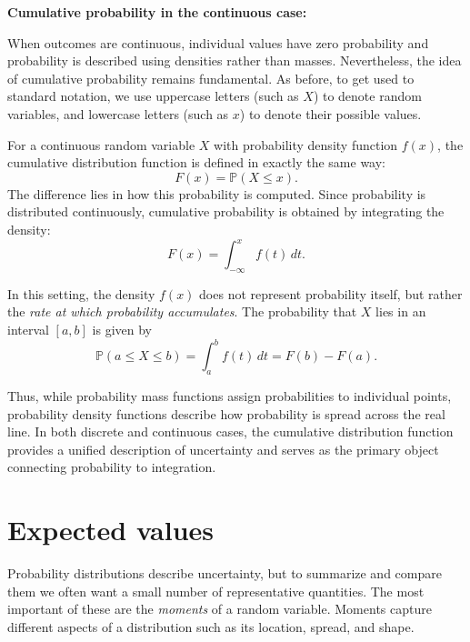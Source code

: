 \medskip

\textbf{Cumulative probability in the continuous case:}

\medskip

When outcomes are continuous, individual values have zero probability and probability is described using densities rather than masses. Nevertheless, the idea of cumulative probability remains fundamental. As before, to get used to standard notation, we use uppercase letters (such as $X$) to denote random variables, and lowercase letters (such as $x$) to denote their possible values.

\medskip

For a continuous random variable $X$ with probability density function $f(x)$, the cumulative distribution function is defined in exactly the same way:
\begin{equation}
    F(x) = \mathbb{P}(X \le x).
\end{equation}
The difference lies in how this probability is computed. Since probability is distributed continuously, cumulative probability is obtained by integrating the density:
\begin{equation}
    F(x) = \int_{-\infty}^{x} f(t)\,dt.
\end{equation}

\medskip

In this setting, the density $f(x)$ does not represent probability itself, but rather the \emph{rate at which probability accumulates}. The probability that $X$ lies in an interval $[a,b]$ is given by
\begin{equation}
    \mathbb{P}(a \le X \le b) = \int_a^b f(t)\,dt = F(b) - F(a).
\end{equation}

\medskip

Thus, while probability mass functions assign probabilities to individual points, probability density functions describe how probability is spread across the real line. In both discrete and continuous cases, the cumulative distribution function provides a unified description of uncertainty and serves as the primary object connecting probability to integration.

\section{Expected values}

Probability distributions describe uncertainty, but to summarize and compare them we often want a small number of representative quantities. The most important of these are the \textit{moments} of a random variable. Moments capture different aspects of a distribution such as its location, spread, and shape.

